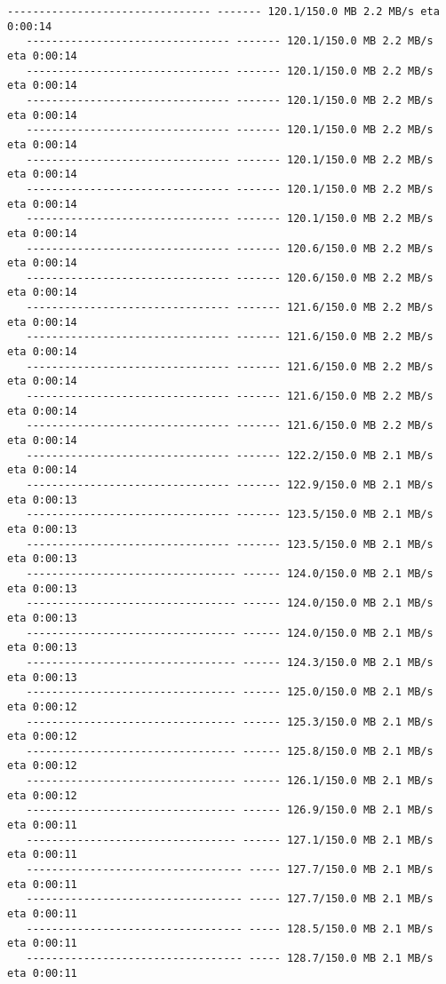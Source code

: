 \documentclass[11pt]{article}
\begin{document}
\begin{Verbatim}[commandchars=\\\{\}]
   -------------------------------- ------- 120.1/150.0 MB 2.2 MB/s eta 0:00:14
   -------------------------------- ------- 120.1/150.0 MB 2.2 MB/s eta 0:00:14
   -------------------------------- ------- 120.1/150.0 MB 2.2 MB/s eta 0:00:14
   -------------------------------- ------- 120.1/150.0 MB 2.2 MB/s eta 0:00:14
   -------------------------------- ------- 120.1/150.0 MB 2.2 MB/s eta 0:00:14
   -------------------------------- ------- 120.1/150.0 MB 2.2 MB/s eta 0:00:14
   -------------------------------- ------- 120.1/150.0 MB 2.2 MB/s eta 0:00:14
   -------------------------------- ------- 120.1/150.0 MB 2.2 MB/s eta 0:00:14
   -------------------------------- ------- 120.6/150.0 MB 2.2 MB/s eta 0:00:14
   -------------------------------- ------- 120.6/150.0 MB 2.2 MB/s eta 0:00:14
   -------------------------------- ------- 121.6/150.0 MB 2.2 MB/s eta 0:00:14
   -------------------------------- ------- 121.6/150.0 MB 2.2 MB/s eta 0:00:14
   -------------------------------- ------- 121.6/150.0 MB 2.2 MB/s eta 0:00:14
   -------------------------------- ------- 121.6/150.0 MB 2.2 MB/s eta 0:00:14
   -------------------------------- ------- 121.6/150.0 MB 2.2 MB/s eta 0:00:14
   -------------------------------- ------- 122.2/150.0 MB 2.1 MB/s eta 0:00:14
   -------------------------------- ------- 122.9/150.0 MB 2.1 MB/s eta 0:00:13
   -------------------------------- ------- 123.5/150.0 MB 2.1 MB/s eta 0:00:13
   -------------------------------- ------- 123.5/150.0 MB 2.1 MB/s eta 0:00:13
   --------------------------------- ------ 124.0/150.0 MB 2.1 MB/s eta 0:00:13
   --------------------------------- ------ 124.0/150.0 MB 2.1 MB/s eta 0:00:13
   --------------------------------- ------ 124.0/150.0 MB 2.1 MB/s eta 0:00:13
   --------------------------------- ------ 124.3/150.0 MB 2.1 MB/s eta 0:00:13
   --------------------------------- ------ 125.0/150.0 MB 2.1 MB/s eta 0:00:12
   --------------------------------- ------ 125.3/150.0 MB 2.1 MB/s eta 0:00:12
   --------------------------------- ------ 125.8/150.0 MB 2.1 MB/s eta 0:00:12
   --------------------------------- ------ 126.1/150.0 MB 2.1 MB/s eta 0:00:12
   --------------------------------- ------ 126.9/150.0 MB 2.1 MB/s eta 0:00:11
   --------------------------------- ------ 127.1/150.0 MB 2.1 MB/s eta 0:00:11
   ---------------------------------- ----- 127.7/150.0 MB 2.1 MB/s eta 0:00:11
   ---------------------------------- ----- 127.7/150.0 MB 2.1 MB/s eta 0:00:11
   ---------------------------------- ----- 128.5/150.0 MB 2.1 MB/s eta 0:00:11
   ---------------------------------- ----- 128.7/150.0 MB 2.1 MB/s eta 0:00:11

\end{Verbatim}
\end{document}
